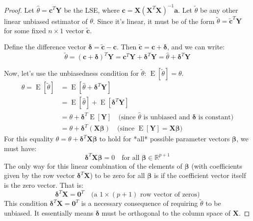 \documentclass[11pt]{article}
\theoremstyle{mytheoremstyle}
\theoremstyle{mydefinitionstyle}
\newcommand{\vect}[1]{\mathbf{#1}}
\DeclareMathOperator{\E}{E}
\begin{document}
\begin{proof}
Let $\hat{\theta} = \vect{c}^T \vect{Y}$ be the LSE, where $\vect{c} = \vect{X} (\vect{X}^T \vect{X})^{-1} \vect{a}$.
Let $\tilde{\theta}$ be any other linear unbiased estimator of $\theta$. Since it's linear, it must be of the form $\tilde{\theta} = \tilde{\vect{c}}^T \vect{Y}$ for some fixed $n \times 1$ vector $\tilde{\vect{c}}$.

Define the difference vector $\vect{\delta} = \tilde{\vect{c}} - \vect{c}$. Then $\tilde{\vect{c}} = \vect{c} + \vect{\delta}$, and we can write:
\begin{equation*}
\tilde{\theta} = (\vect{c} + \vect{\delta})^T \vect{Y} = \vect{c}^T \vect{Y} + \vect{\delta}^T \vect{Y} = \hat{\theta} + \vect{\delta}^T \vect{Y}
\end{equation*}

Now, let's use the unbiasedness condition for $\tilde{\theta}$: $\E[\tilde{\theta}] = \theta$.
\begin{align*}
\theta = \E[\tilde{\theta}] &= \E[\hat{\theta} + \vect{\delta}^T \vect{Y}] \\
&= \E[\hat{\theta}] + \E[\vect{\delta}^T \vect{Y}] \\
&= \theta + \vect{\delta}^T \E[\vect{Y}] \quad \text{(since } \hat{\theta} \text{ is unbiased and } \vect{\delta} \text{ is constant)} \\
&= \theta + \vect{\delta}^T (\vect{X}\vect{\beta}) \quad \text{(since } \E[\vect{Y}] = \vect{X}\vect{\beta})
\end{align*}
For this equality $\theta = \theta + \vect{\delta}^T \vect{X}\vect{\beta}$ to hold for *all* possible parameter vectors $\vect{\beta}$, we must have:
\begin{equation}
\vect{\delta}^T \vect{X}\vect{\beta} = 0 \quad \text{for all } \vect{\beta} \in \mathbb{R}^{p+1} \label{eq:unbias_cond}
\end{equation}
The only way for this linear combination of the elements of $\vect{\beta}$ (with coefficients given by the row vector $\vect{\delta}^T \vect{X}$) to be zero for all $\vect{\beta}$ is if the coefficient vector itself is the zero vector. That is:
\begin{equation}
\vect{\delta}^T \vect{X} = \vect{0}^T \quad \text{(a } 1 \times (p+1) \text{ row vector of zeros)} \label{eq:deltaTX_zero}
\end{equation}
This condition $\vect{\delta}^T \vect{X} = \vect{0}^T$ is a necessary consequence of requiring $\tilde{\theta}$ to be unbiased. It essentially means $\vect{\delta}$ must be orthogonal to the column space of $\vect{X}$.


\end{proof}
\end{document}
